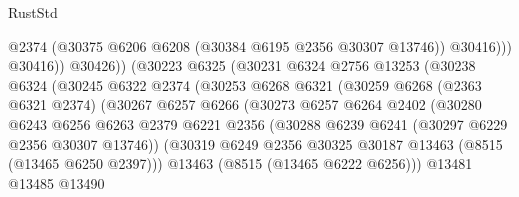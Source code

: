\begin{lexlean}{RustStd}
\begin{coremodule}
                                          @2374
                                          (@30375 @6206 @6208 (@30384 @6195 @2356 @30307 @13746))
                                          @30416)))
                                    @30416))
                                @30426))
                            (@30223
                              @6325
                              (@30231
                                @6324
                                @2756
                                @13253
                                (@30238
                                  @6324
                                  (@30245
                                    @6322
                                    @2374
                                    (@30253
                                      @6268
                                      @6321
                                      (@30259
                                        @6268
                                        (@2363 @6321 @2374)
                                        (@30267
                                          @6257
                                          @6266
                                          (@30273
                                            @6257
                                            @6264
                                            @2402
                                            (@30280
                                              @6243
                                              @6256
                                              @6263
                                              @2379
                                              @6221
                                              @2356
                                              (@30288
                                                @6239
                                                @6241
                                                (@30297 @6229 @2356 @30307 @13746))
                                              (@30319
                                                @6249
                                                @2356
                                                @30325
                                                @30187
                                                @13463
                                                (@8515 (@13465 @6250 @2397)))
                                              @13463
                                              (@8515 (@13465 @6222 @6256)))
                                            @13481
                                            @13485
                                            @13490

\end{coremodule}
\end{lexlean}
